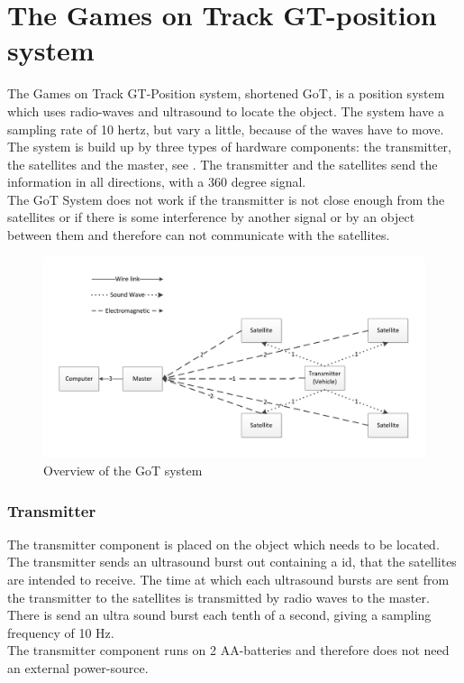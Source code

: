\section{The Games on Track GT-position system}
\label{GoTDescription}
The Games on Track GT-Position system, shortened GoT, is a position system which uses radio-waves and ultrasound to locate the object. The system have a sampling rate of 10 hertz, but vary a little, because of the waves have to move. The system is build up by three types of hardware components: the transmitter, the satellites and the master, see . The transmitter and the satellites send the information in all directions, with a 360 degree signal.\\
The GoT System does not work if the transmitter is not close enough from the satellites or if there is some interference by another signal or by an object between them and therefore can not communicate with the satellites.

\begin{figure}[H]
	\centering
	\includegraphics[scale=0.6]{figures/GoT_description.pdf}
	\caption{Overview of the GoT system}
	\label{GoTSystem}
\end{figure}

\subsubsection{Transmitter}
The transmitter component is placed on the object which needs to be located. The transmitter sends an ultrasound burst out containing a id, that the satellites are intended to receive. The time at which each ultrasound bursts are sent from the transmitter to the satellites is transmitted by radio waves to the master. There is send an ultra sound burst each tenth of a second, giving a sampling frequency of 10 Hz.\\ 
The transmitter component runs on 2 AA-batteries and therefore does not need an external power-source.\\

